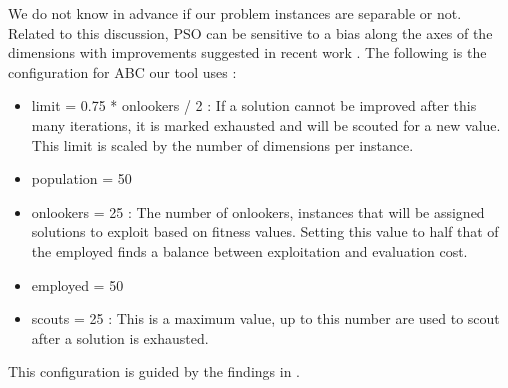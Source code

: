 We do not know in advance if our problem instances are separable or not. Related to this discussion, PSO can be sensitive to a bias along the axes of the dimensions \cite{PSOBias} with improvements suggested in recent work \cite{PSOBiasAlg}. The following is the configuration for ABC our tool uses : 
\begin{itemize}
\item limit = 0.75 * onlookers / 2 : If a solution cannot be improved after this many iterations, it is marked exhausted and will be scouted for a new value. This limit is scaled by the number of dimensions per instance. 
\item population = 50 
\item onlookers = 25 : The number of onlookers, instances that will be assigned solutions to exploit based on fitness values. Setting this value to half that of the employed finds a balance between exploitation and evaluation cost.
\item employed = 50 
\item scouts = 25 : This is a maximum value, up to this number are used to scout after a solution is exhausted. 
\end{itemize}
This configuration is guided by the findings in \cite{ABC}.
